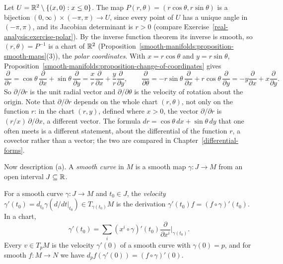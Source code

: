 \begin{example}\label{smooth-manifolds:example-polar}
Let $U = \mathbb{R}^2 \setminus \{(x, 0) : x \leq 0\}$. The map $P(r, \theta) = (r\cos\theta, r\sin\theta)$ is a bijection $(0, \infty) \times (-\pi, \pi) \to U$,
since every point of $U$ has a unique angle in $(-\pi, \pi)$, and its Jacobian determinant is $r > 0$ (compare Exercise~\ref{real-analysis:exercise-polar}).
By the inverse function theorem its inverse is smooth, so $(r, \theta) = P^{-1}$ is a chart of $\mathbb{R}^2$
(Proposition~\ref{smooth-manifolds:proposition-smooth-maps}(3)), the \emph{polar coordinates}. With $x = r\cos\theta$ and $y = r\sin\theta$,
Proposition~\ref{smooth-manifolds:proposition-change-of-coordinates} gives
\[
\frac{\partial}{\partial r} = \cos\theta\,\frac{\partial}{\partial x} + \sin\theta\,\frac{\partial}{\partial y} = \frac{x}{r}\frac{\partial}{\partial x}
+ \frac{y}{r}\frac{\partial}{\partial y}, \qquad \frac{\partial}{\partial\theta} = -r\sin\theta\,\frac{\partial}{\partial x} + r\cos\theta\,\frac{\partial}{\partial y}
= -y\frac{\partial}{\partial x} + x\frac{\partial}{\partial y}.
\]
So $\partial/\partial r$ is the unit radial vector and $\partial/\partial\theta$ is the velocity of rotation about the origin. Note that $\partial/\partial r$
depends on the whole chart $(r, \theta)$, not only on the function $r$: in the chart $(r, y)$, defined where $x > 0$, the vector $\partial/\partial r$ is
$(r/x)\,\partial/\partial x$, a different vector. The formula $dr = \cos\theta\,dx + \sin\theta\,dy$ that one often meets is a different statement, about the differential
of the function $r$, a covector rather than a vector; the two are compared in Chapter~\ref{differential-forms}.
\end{example}

Now description (a). A \emph{smooth curve} in $M$ is a smooth map $\gamma \colon J \to M$ from an open interval $J \subseteq \mathbb{R}$.

\begin{proposition}\label{smooth-manifolds:proposition-velocity}
For a smooth curve $\gamma \colon J \to M$ and $t_0 \in J$, the \emph{velocity} $\gamma'(t_0) = d_{t_0}\gamma(d/dt|_{t_0}) \in T_{\gamma(t_0)}M$ is the derivation
$\gamma'(t_0)f = (f \circ \gamma)'(t_0)$. In a chart,
\[
\gamma'(t_0) = \sum_i(x^i \circ \gamma)'(t_0)\frac{\partial}{\partial x^i}\Big|_{\gamma(t_0)}.
\]
Every $v \in T_pM$ is the velocity $\gamma'(0)$ of a smooth curve with $\gamma(0) = p$, and for smooth $f \colon M \to N$ we have
$d_pf(\gamma'(0)) = (f \circ \gamma)'(0)$.
\end{proposition}

